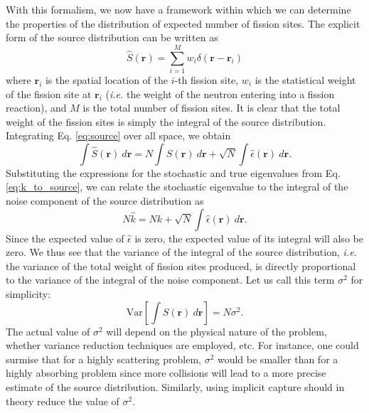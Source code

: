 With this formalism, we now have a framework within which we can
determine the properties of the distribution of expected number of
fission sites. The explicit form of the source distribution can be
written as
\begin{equation}
  \hat{S}(\mathbf{r}) = \sum_{i=1}^{M} w_i \delta( \mathbf{r} -
  \mathbf{r}_i )
\end{equation}
where $\mathbf{r}_i$ is the spatial location of the $i$-th fission
site, $w_i$ is the statistical weight of the fission site at
$\mathbf{r}_i$ ({\em i.e.} the weight of the neutron entering into a
fission reaction), and $M$ is the total number of fission sites. It is
clear that the total weight of the fission sites is simply the
integral of the source distribution. Integrating Eq. \ref{eq:source}
over all space, we obtain
\begin{equation}
  \int \hat{S}(\mathbf{r}) \: d\mathbf{r} = N \int S(\mathbf{r}) \:
  d\mathbf{r} + \sqrt{N} \int \hat{\epsilon}(\mathbf{r}) \:
  d\mathbf{r} .
\end{equation}
Substituting the expressions for the stochastic and true eigenvalues
from Eq. \ref{eq:k_to_source}, we can relate the stochastic eigenvalue
to the integral of the noise component of the source distribution as
\begin{equation}
  N\hat{k} = Nk + \sqrt{N} \int \hat{\epsilon}(\mathbf{r}) \:
  d\mathbf{r}.
\end{equation}
Since the expected value of $\hat{\epsilon}$ is zero, the expected
value of its integral will also be zero. We thus see that the variance
of the integral of the source distribution, {\em i.e.} the variance of
the total weight of fission sites produced, is directly proportional
to the variance of the integral of the noise component. Let us call
this term $\sigma^2$ for simplicity:
\begin{equation}
  \text{Var} \left[ \int \hat{S}(\mathbf{r}) \: d\mathbf{r} \right ] =
  N \sigma^2.
\end{equation}
The actual value of $\sigma^2$ will depend on the physical nature of
the problem, whether variance reduction techniques are employed,
etc. For instance, one could surmise that for a highly scattering
problem, $\sigma^2$ would be smaller than for a highly absorbing
problem since more collisions will lead to a more precise estimate of
the source distribution. Similarly, using implicit capture should in
theory reduce the value of $\sigma^2$.

